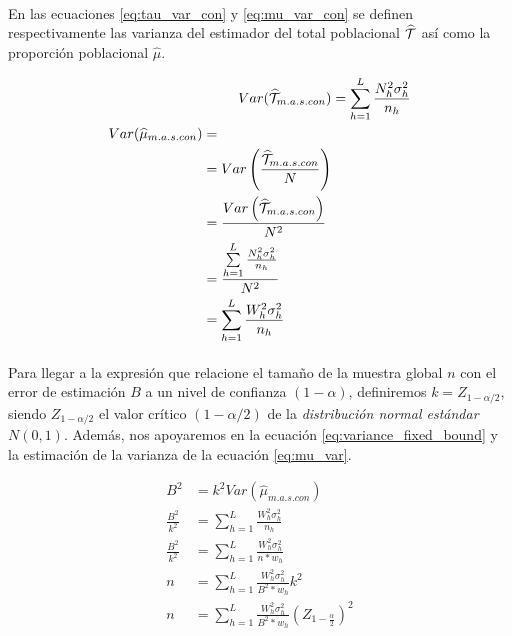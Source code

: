 \documentclass{article}
\begin{document}
    \paragraph{}
    En las ecuaciones \eqref{eq:tau_var_con} y \eqref{eq:mu_var_con} se definen respectivamente las varianza del estimador del total poblacional $\widehat{\mathcal{T}}$  así como la proporción poblacional $\widehat{\mu}$.

    \begin{align}
    \label{eq:tau_var_con}
      Var(\widehat{\mathcal{T}}_{m.a.s.con}) &= \sum\limits_{h=1}^L\frac{N_h^2\sigma_h^{2}}{n_h} \\
    \label{eq:mu_var_con}
      \begin{split}
        Var(\widehat{\mu}_{m.a.s.con}) &=\\
        &= Var\left(\frac{\widehat{\mathcal{T}}_{m.a.s.con}}{N}\right) \\
        &= \frac{Var\left(\widehat{\mathcal{T}}_{m.a.s.con}\right)}{N^2} \\
        &= \frac{\sum\limits_{h=1}^L\frac{N_h^2\sigma_h^{2}}{n_h}}{N^2} \\
        &= \sum\limits_{h=1}^L\frac{W_h^2\sigma_h^{2}}{n_h}
      \end{split}
    \end{align}


    \paragraph{}
    Para llegar a la expresión que relacione el tamaño de la muestra global $n$ con el error de estimación $B$ a un nivel de confianza $(1-\alpha)$, definiremos $k = Z_{1-\alpha/2}$, siendo $Z_{1-\alpha/2 }$ el valor crítico $(1-\alpha/2)$ de la \emph{distribución normal estándar $N(0,1)$}. Además, nos apoyaremos en la ecuación \eqref{eq:variance_fixed_bound} y la estimación de la varianza de la ecuación \eqref{eq:mu_var}.


    \begin{align}
      B^2 &= k^2Var(\widehat{\mu}_{m.a.s.con}) \\
      \frac{B^2}{k^2} &= \sum\limits_{h=1}^L\frac{W_h^2\sigma_h^{2}}{n_h}\\
      \frac{B^2}{k^2} &= \sum\limits_{h=1}^L\frac{W_h^2\sigma_h^{2}}{n*w_h}\\
      n &= \sum\limits_{h=1}^L\frac{W_h^2\sigma_h^{2}}{B^2*w_h}k^2\\
      n &= \sum\limits_{h=1}^L\frac{W_h^2\sigma_h^{2}}{B^2*w_h}\left(Z_{1-\frac{\alpha}{2}}\right)^2
    \end{align}


  \nocite{muest2017}
  \nocite{sarndal2003model}

  
  
\end{document}
